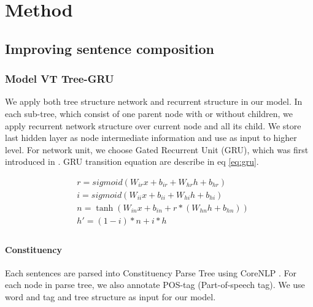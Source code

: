 \chapter{Method}


\section{Improving sentence composition}

\subsection{Model VT Tree-GRU}\label{sec:VTtree}
We apply both tree structure network and recurrent structure in our model. In each sub-tree, which consist of one parent node with or without children, we apply recurrent network structure over current node and all its child. We store last hidden layer as node intermediate information and use as input to higher level. For network unit, we choose Gated Recurrent Unit (GRU), which was first introduced in \cite{cho2014learning}. GRU transition equation are describe in eq \ref{eq:gru}.

\begin{equation}
\label{eq:gru}
\begin{aligned}
&r = sigmoid(W_{ir} x + b_{ir} + W_{hr} h + b_{hr}) \\
&i = sigmoid(W_{ii} x + b_{ii} + W_{hi} h + b_{hi}) \\
&n = \tanh(W_{in} x + b_{in} + r * (W_{hn} h + b_{hn})) \\
&h' = (1 - i) * n + i * h\\
\end{aligned}
\end{equation}

\subsubsection{Constituency}
Each sentences are parsed into Constituency Parse Tree using CoreNLP \cite{manning2014stanford}. For each node in parse tree, we also annotate POS-tag (Part-of-speech tag). We use word and tag and tree structure as input for our model.

